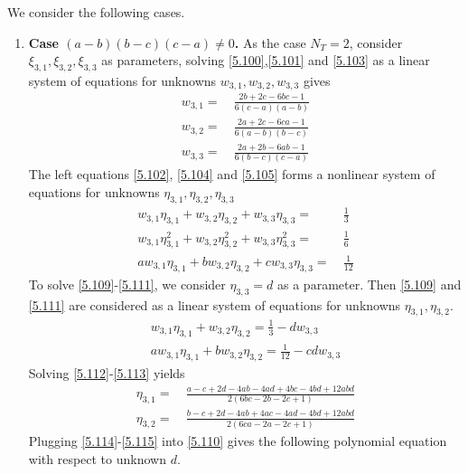 \documentclass[a4paper]{article}
\numberwithin{equation}{section}
\begin{document}
We consider the following cases.
\begin{enumerate}
\item \textbf{Case $\left( {a - b} \right)\left( {b - c} \right)\left( {c - a} \right) \ne 0$.} As the case $N_T=2$, consider $\xi _{3,1},\xi _{3,2},\xi _{3,3}$ as parameters, solving \eqref{5.100},\eqref{5.101} and \eqref{5.103} as a linear system of equations for unknowns $w _{3,1},w _{3,2},w _{3,3}$ gives
\begin{align}
\label{5.106}
{w_{3,1}} =&\ \frac{{2b + 2c - 6bc - 1}}{{6\left( {c - a} \right)\left( {a - b} \right)}}\\
{w_{3,2}} =&\ \frac{{2a + 2c - 6ca - 1}}{{6\left( {a - b} \right)\left( {b - c} \right)}}\\
{w_{3,3}} =&\ \frac{{2a + 2b - 6ab - 1}}{{6\left( {b - c} \right)\left( {c - a} \right)}} \label{5.108}
\end{align}
The left equations \eqref{5.102}, \eqref{5.104} and \eqref{5.105} forms a nonlinear system of equations for unknowns $\eta _{3,1},\eta _{3,2},\eta _{3,3}$
\begin{align}
\label{5.109}
{w_{3,1}}{\eta _{3,1}} + {w_{3,2}}{\eta _{3,2}} + {w_{3,3}}{\eta _{3,3}} =&\ \frac{1}{3}\\
{w_{3,1}}\eta _{3,1}^2 + {w_{3,2}}\eta _{3,2}^2 + {w_{3,3}}\eta _{3,3}^2 =&\ \frac{1}{6}\label{5.110}\\
a{w_{3,1}}{\eta _{3,1}} + b{w_{3,2}}{\eta _{3,2}} + c{w_{3,3}}{\eta _{3,3}} =&\ \frac{1}{{12}} \label{5.111}
\end{align}
To solve \eqref{5.109}-\eqref{5.111}, we consider $\eta _{3,3}=d$ as a parameter. Then \eqref{5.109} and \eqref{5.111} are considered as a linear system of equations for unknowns $\eta _{3,1},\eta _{3,2}$.
\begin{align}
\label{5.112}
{w_{3,1}}{\eta _{3,1}} + {w_{3,2}}{\eta _{3,2}} = \frac{1}{3} - d{w_{3,3}}\\
a{w_{3,1}}{\eta _{3,1}} + b{w_{3,2}}{\eta _{3,2}} = \frac{1}{{12}} - cd{w_{3,3}} \label{5.113}
\end{align}
Solving \eqref{5.112}-\eqref{5.113} yields
\begin{align}
\label{5.114}
{\eta _{3,1}} =&\ \frac{{a - c + 2d - 4ab - 4ad + 4bc - 4bd + 12abd}}{{2\left( {6bc - 2b - 2c + 1} \right)}}\\
{\eta _{3,2}} =&\ \frac{{b - c + 2d - 4ab + 4ac - 4ad - 4bd + 12abd}}{{2\left( {6ca - 2a - 2c + 1} \right)}} \label{5.115}
\end{align}
Plugging \eqref{5.114}-\eqref{5.115} into \eqref{5.110} gives the following polynomial equation with respect to unknown $d$.

\end{enumerate}
\end{document}
